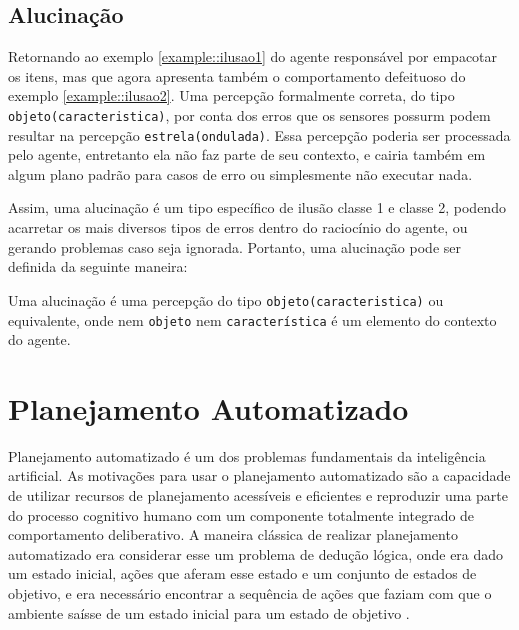 \subsection{Alucinação}

\begin{example} {}
    Retornando ao exemplo \ref{example::ilusao1} do agente responsável por empacotar os itens, mas que agora apresenta também o comportamento defeituoso do exemplo \ref{example::ilusao2}. Uma percepção formalmente correta, do tipo \texttt{objeto(caracteristica)}, por conta dos erros que os sensores possurm podem resultar na percepção \texttt{estrela(ondulada)}. Essa percepção poderia ser processada pelo agente, entretanto ela não faz parte de seu contexto, e cairia também em algum plano padrão para casos de erro ou simplesmente não executar nada.
    \label{exemple::alucinacao}
\end{example}

Assim, uma alucinação é um tipo específico de ilusão classe 1 e classe 2, podendo acarretar os mais diversos tipos de erros dentro do raciocínio do agente, ou gerando problemas caso seja ignorada. Portanto, uma alucinação pode ser definida da seguinte maneira:

\begin{definition}{}
   Uma alucinação é uma percepção do tipo \texttt{objeto(caracteristica)} ou equivalente, onde nem \texttt{objeto} nem \texttt{característica} é um elemento do contexto do agente.
\end{definition}

\section{Planejamento Automatizado}

Planejamento automatizado é um dos problemas fundamentais da inteligência artificial. As motivações para usar o planejamento automatizado são a capacidade de utilizar recursos de planejamento acessíveis e eficientes e reproduzir uma parte do processo cognitivo humano com um componente totalmente integrado de comportamento deliberativo\cite{GHALLAB20041}. A maneira clássica de realizar planejamento automatizado era considerar esse um problema de dedução lógica, onde era dado um estado inicial, ações que aferam esse estado e um conjunto de estados de objetivo, e era necessário encontrar a sequência de ações que faziam com que o ambiente saísse de um estado inicial para um estado de objetivo \cite{MADANI20035}.

